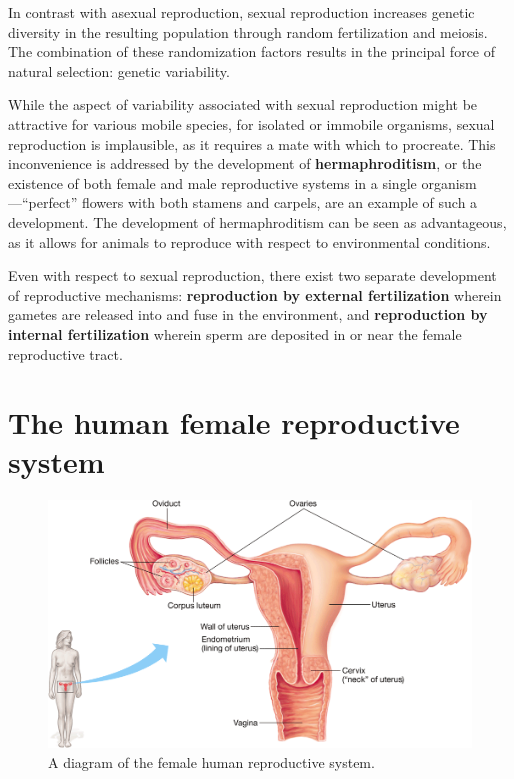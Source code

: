 \documentclass{article}
\begin{document}
In contrast with asexual reproduction, sexual reproduction increases genetic
diversity in the resulting population through random fertilization and
meiosis. The combination of these randomization factors results in the
principal force of natural selection: genetic variability.

While the aspect of variability associated with sexual reproduction might be
attractive for various mobile species, for isolated or immobile organisms,
sexual reproduction is implausible, as it requires a mate with which to
procreate. This inconvenience is addressed by the development of
\textbf{hermaphroditism}, or the existence of both female and male
reproductive systems in a single organism---``perfect'' flowers with both
stamens and carpels, are an example of such a development. The development
of hermaphroditism can be seen as advantageous, as it allows for animals to
reproduce with respect to environmental conditions.

Even with respect to sexual reproduction, there exist two separate development
of reproductive mechanisms: \textbf{reproduction by external fertilization}
wherein gametes are released into and fuse in the environment, and
\textbf{reproduction by internal fertilization} wherein sperm are deposited in
or near the female reproductive tract.

\section{The human female reproductive system}

\begin{figure}
	\centering
	\includegraphics[width=0.9\linewidth]{female_reproductive_system.png}
	\caption{A diagram of the female human reproductive system.}
\end{figure}
\end{document}
